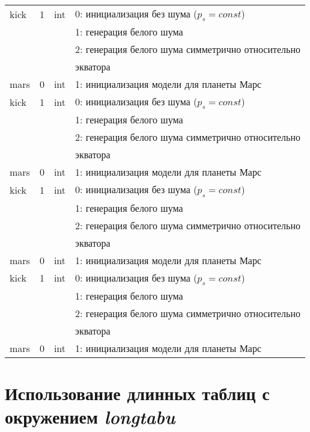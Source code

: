 \begin{longtable}[c]{|l|c|l|l|}
    kick     & 1      & int & 0: инициализация без шума (\(p_s = const\))       \\
             &        &     & 1: генерация белого шума                          \\
             &        &     & 2: генерация белого шума симметрично относительно \\
             &        &     & экватора                                          \\
    mars     & 0      & int & 1: инициализация модели для планеты Марс          \\
    kick     & 1      & int & 0: инициализация без шума (\(p_s = const\))       \\
             &        &     & 1: генерация белого шума                          \\
             &        &     & 2: генерация белого шума симметрично относительно \\
             &        &     & экватора                                          \\
    mars     & 0      & int & 1: инициализация модели для планеты Марс          \\
    kick     & 1      & int & 0: инициализация без шума (\(p_s = const\))       \\
             &        &     & 1: генерация белого шума                          \\
             &        &     & 2: генерация белого шума симметрично относительно \\
             &        &     & экватора                                          \\
    mars     & 0      & int & 1: инициализация модели для планеты Марс          \\
    kick     & 1      & int & 0: инициализация без шума (\(p_s = const\))       \\
             &        &     & 1: генерация белого шума                          \\
             &        &     & 2: генерация белого шума симметрично относительно \\
             &        &     & экватора                                          \\
    mars     & 0      & int & 1: инициализация модели для планеты Марс          \\
\end{longtable}
\normalsize%
\endgroup
\section{Использование длинных таблиц с окружением \textit{longtabu}}\label{app:B2a}

